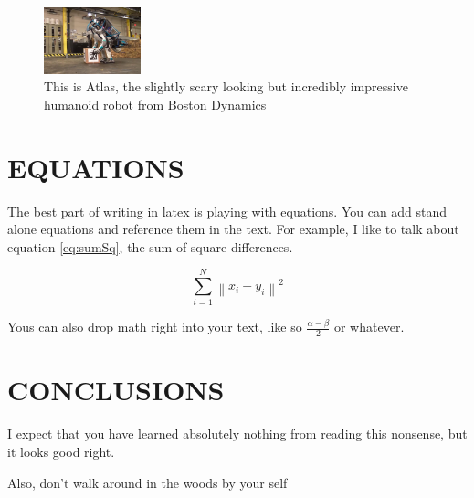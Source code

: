 \documentclass[letterpaper, 10 pt, conference]{ieeeconf}  %
\newcommand{\norm}[1]{\left\lVert#1\right\rVert}
\begin{document}
\begin{figure}[h]
\centering
\includegraphics[width=0.25\textwidth]{atlas}
\caption{This is Atlas, the slightly scary looking but incredibly impressive humanoid robot from Boston Dynamics}
\label{fig:atlas}
\end{figure}

\label{eq}
\section{EQUATIONS}

The best part of writing in latex is playing with equations. You can add stand alone equations and reference them in the text. For example, I like to talk about equation \ref{eq:sumSq}, the sum of square differences.

\begin{equation} \label{eq:sumSq}
\sum_{i=1}^{N} \norm{x_i - y_i} ^{2}
\end{equation}

Yous can also drop math right into your text, like so $\frac{\alpha - \beta}{2}$ or whatever\cite{web:texMath}.

\section{CONCLUSIONS}

I expect that you have learned absolutely nothing from reading this nonsense, but it looks good right.

Also, don't walk around in the woods by your self\cite{book:lrr}

\addtolength{\textheight}{-12cm}   %





\end{document}
